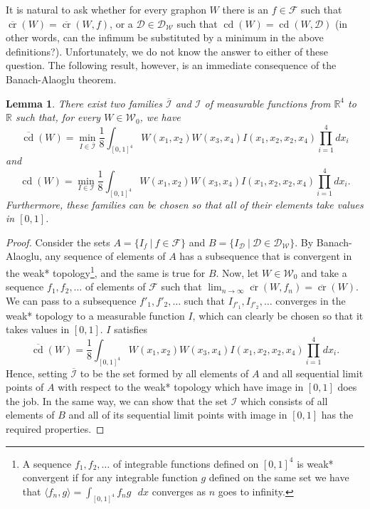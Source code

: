 \documentclass{article}
\newcounter{contSect} \numberwithin{contSect}{section}
\newtheorem{lemma}[contSect]{Lemma}
\begin{document}
It is natural to ask whether for every graphon $W$ there is an $f\in\mathcal{F}$ such that $\overline{\mathop{\mathrm{cr}}}(W)=\overline{\mathop{\mathrm{cr}}}(W,f)$, or a $\mathcal{D}\in\mathcal{D}_\mathcal{W}$ such that $\mathop{\mathrm{cd}}(W)=\mathop{\mathrm{cd}}(W,\mathcal{D})$ (in other words, can the infimum be substituted by a minimum in the above definitions?). Unfortunately, we do not know the answer to either of these question. The following result, however, is an immediate consequence of the Banach-Alaoglu theorem.

\begin{lemma}\label{teo:weakclosure}
There exist two families $\overline{\mathcal{I}}$ and $\mathcal{I}$ of measurable functions from $\mathbb{R}^4$ to $\mathbb{R}$ such that, for every $W\in\mathcal{W}_0$, we have \[\overline{\mathop{\mathrm{cd}}}(W)=\min_{I\in\overline{\mathcal{I}}}\frac{1}{8}\int_{[0,1]^4}W(x_1,x_2)W(x_3,x_4)I(x_1,x_2,x_2,x_4)\prod_{i=1}^4 dx_i\] and \[\mathop{\mathrm{cd}}(W)=\min_{I\in\mathcal{I}}\frac{1}{8}\int_{[0,1]^4}W(x_1,x_2)W(x_3,x_4)I(x_1,x_2,x_2,x_4)\prod_{i=1}^4 dx_i.\] Furthermore, these families can be chosen so that all of their elements take values in $[0,1]$.
\end{lemma}

\begin{proof}
    Consider the sets $A=\{I_f\ |\ f\in\mathcal{F}\}$ and $B=\{I_\mathcal{D}\ |\ \mathcal{D}\in\mathcal{D}_\mathcal{W}\}$. By Banach-Alaoglu, any sequence of elements of $A$ has a subsequence that is convergent in the weak* topology\footnote{A sequence $f_1,f_2,\dots$ of integrable functions defined on $[0,1]^4$ is weak* convergent if for any integrable function $g$ defined on the same set we have that $\langle f_n,g\rangle=\int_{[0,1]^4}f_ng\text{ } dx$ converges as $n$ goes to infinity.}, and the same is true for $B$. Now, let $W\in\mathcal{W}_0$ and take a sequence $f_1,f_2,\dots$ of elements of $\mathcal{F}$ such that $\lim_{n\rightarrow\infty}\overline{\mathop{\mathrm{cr}}}(W,f_n)=\overline{\mathop{\mathrm{cr}}}(W)$. We can pass to a subsequence $f'_1,f ' _2,\dots$ such that $I_{f'_1},I_{f'_2},\dots$ converges in the weak* topology to a measurable function $I$, which can clearly be chosen so that it takes values in $[0,1]$. $I$ satisfies \[\overline{\mathop{\mathrm{cd}}}(W)=\frac{1}{8}\int_{[0,1]^4}W(x_1,x_2)W(x_3,x_4)I(x_1,x_2,x_2,x_4)\prod_{i=1}^4 dx_i.\] Hence, setting $\overline{\mathcal{I}}$ to be the set formed by all elements of $A$ and all sequential limit points of $A$ with respect to the weak* topology which have image in $[0,1]$ does the job. In the same way, we can show that the set $\mathcal{I}$ which consists of all elements of $B$ and all of its sequential limit points with image in $[0,1]$ has the required properties.
\end{proof}
\end{document}
